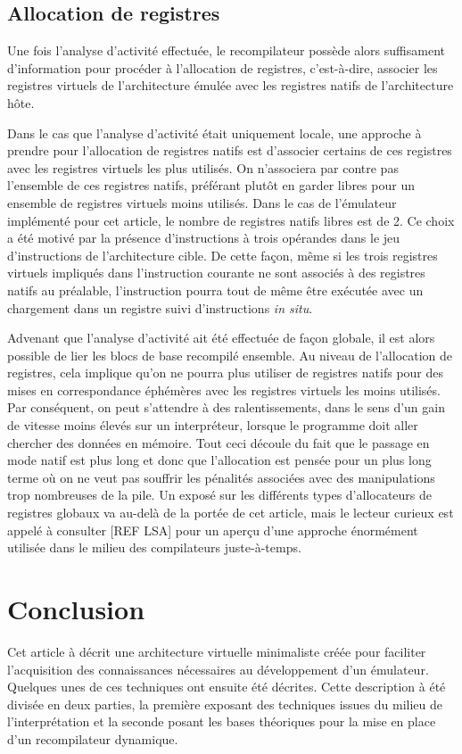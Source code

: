 \documentclass{article} %
\begin{document}
\subsection{Allocation de registres}
Une fois l'analyse d'activité effectuée, le recompilateur possède alors suffisament d'information pour procéder à l'allocation de registres, c'est-à-dire, associer les registres virtuels de l'architecture émulée avec les registres natifs de l'architecture hôte.

Dans le cas que l'analyse d'activité était uniquement locale, une approche à prendre pour l'allocation de registres natifs est d'associer certains de ces registres avec les registres virtuels les plus utilisés. On n'associera par contre pas l'ensemble de ces registres natifs, préférant plutôt en garder libres pour un ensemble de registres virtuels moins utilisés. Dans le cas de l'émulateur implémenté pour cet article, le nombre de registres natifs libres est de 2. Ce choix a été motivé par la présence d'instructions à trois opérandes dans le jeu d'instructions de l'architecture cible. De cette façon, même si les trois registres virtuels impliqués dans l'instruction courante ne sont associés à des registres natifs au préalable, l'instruction pourra tout de même être exécutée avec un chargement dans un registre suivi d'instructions \textit{in situ}.

Advenant que l'analyse d'activité ait été effectuée de façon globale, il est alors possible de lier les blocs de base recompilé ensemble. Au niveau de l'allocation de registres, cela implique qu'on ne pourra plus utiliser de registres natifs pour des mises en correspondance éphémères avec les registres virtuels les moins utilisés. Par conséquent, on peut s'attendre à des ralentissements, dans le sens d'un gain de vitesse moins élevés sur un interpréteur, lorsque le programme doit aller chercher des données en mémoire. Tout ceci découle du fait que le passage en mode natif est plus long et donc que l'allocation est pensée pour un plus long terme où on ne veut pas souffrir les pénalités associées avec des manipulations trop nombreuses de la pile. Un exposé sur les différents types d'allocateurs de registres globaux va au-delà de la portée de cet article, mais le lecteur curieux est appelé à consulter [REF LSA] pour un aperçu d'une approche énormément utilisée dans le milieu des compilateurs juste-à-temps.

\section{Conclusion}
Cet article à décrit une architecture virtuelle minimaliste créée pour faciliter l'acquisition des connaissances nécessaires au développement d'un émulateur. Quelques unes de ces techniques ont ensuite été décrites. Cette description à été divisée en deux parties, la première exposant des techniques issues du milieu de l'interprétation et la seconde posant les bases théoriques pour la mise en place d'un recompilateur dynamique.
\end{document}
